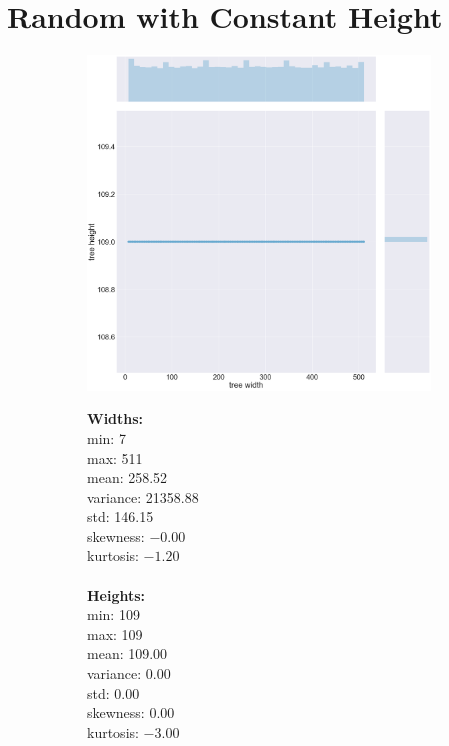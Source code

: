 \section{Random with Constant Height}
\label{appendix:data:randconstheight}
\begin{figure}[H]
\centering
\begin{subfigure}{.8\textwidth}
	\includegraphics[width=.9\textwidth]{img/2_RANDCONSTHEIGHT_plot.png}
\end{subfigure}%
\begin{subfigure}{.2\textwidth}
  \centering
  \begin{minipage}{1\textwidth}
\textbf{Widths:}
\\
min: 7
\\
max: 511
\\
mean: 258.52
\\
variance: 21358.88
\\
std: 146.15
\\
skewness: $-0.00$
\\
kurtosis: $-1.20$
\\\\
\textbf{Heights:}
\\
min: 109
\\
max: 109
\\
mean: 109.00
\\
variance: 0.00
\\
std: 0.00
\\
skewness: 0.00
\\
kurtosis: $-3.00$
  \end{minipage}
\end{subfigure}
\end{figure}

